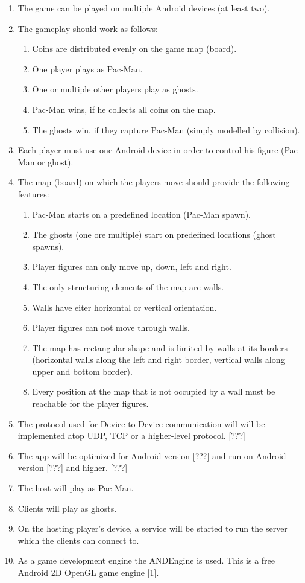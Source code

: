 \documentclass{report}
\begin{document}
\begin{enumerate}
	\item The game can be played on multiple Android devices (at least two).
	\item The gameplay should work as follows:
	\begin{enumerate}
		\item Coins are distributed evenly on the game map (board).
		\item One player plays as Pac-Man.
		\item One or multiple other players play as ghosts.
		\item Pac-Man wins, if he collects all coins on the map.
		\item The ghosts win, if they capture Pac-Man (simply modelled by collision).
	\end{enumerate}
	\item Each player must use one Android device in order to control his figure (Pac-Man or ghost).
	\item The map (board) on which the players move should provide the following features:
	\begin{enumerate}
		\item Pac-Man starts on a predefined location (Pac-Man spawn).
		\item The ghosts (one ore multiple) start on predefined locations (ghost spawns).
		\item Player figures can only move up, down, left and right.
		\item The only structuring elements of the map are walls.
		\item Walls have eiter horizontal or vertical orientation.
		\item Player figures can not move through walls.
		\item The map has rectangular shape and is limited by walls at its borders (horizontal walls along the left and right border, vertical walls along upper and bottom border).
		\item Every position at the map that is not occupied by a wall must be reachable for the player figures. 
	\end{enumerate}
	\item The protocol used for Device-to-Device communication will will be implemented atop UDP, TCP or a higher-level protocol. [???]
	\item The app will be optimized for Android version [???] and run on Android version [???] and higher. [???]
	\item The host will play as Pac-Man.
	\item Clients will play as ghosts.
	\item On the hosting player's device, a service will be started to run the server which the clients can connect to.
	\item As a game development engine the ANDEngine is used. This is a free Android 2D OpenGL game engine [1].
	
\end{enumerate}
\end{document}
